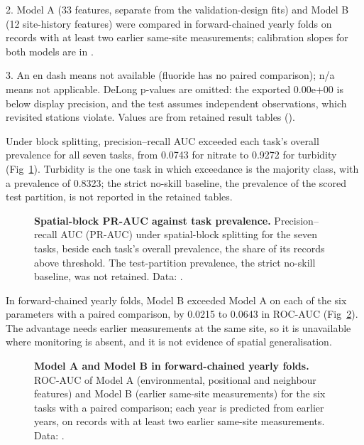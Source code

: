 \documentclass[10pt,letterpaper]{article}
\begin{document}
\begin{table}[!ht]
{\begin{flushleft}
2. Model A (33 features, separate from the validation-design fits) and Model B (12 site-history features) were compared in forward-chained yearly folds on records with at least two earlier same-site measurements; calibration slopes for both models are in .

3. An en dash means not available (fluoride has no paired comparison); n/a means not applicable. DeLong p-values are omitted: the exported 0.00e+00 is below display precision, and the test assumes independent observations, which revisited stations violate. Values are from retained result tables ().
\end{flushleft}
}
\label{table3}
\end{table}

Under block splitting, precision--recall AUC exceeded each task's overall prevalence for all seven tasks, from 0.0743 for nitrate to 0.9272 for turbidity (Fig~\ref{fig:prevalence-prauc}). Turbidity is the one task in which exceedance is the majority class, with a prevalence of 0.8323; the strict no-skill baseline, the prevalence of the scored test partition, is not reported in the retained tables.\label{callout:fig:prevalence-prauc}

\begin{figure}[!ht]
\caption{\textbf{Spatial-block PR-AUC against task prevalence.} Precision--recall AUC (PR-AUC) under spatial-block splitting for the seven tasks, beside each task's overall prevalence, the share of its records above threshold. The test-partition prevalence, the strict no-skill baseline, was not retained. Data: .}
\label{fig:prevalence-prauc}
\end{figure}

In forward-chained yearly folds, Model B exceeded Model A on each of the six parameters with a paired comparison, by 0.0215 to 0.0643 in ROC-AUC (Fig~\ref{fig:channel-comparison}). The advantage needs earlier measurements at the same site, so it is unavailable where monitoring is absent, and it is not evidence of spatial generalisation.\label{callout:fig:channel-comparison}

\begin{figure}[!ht]
\caption{\textbf{Model A and Model B in forward-chained yearly folds.} ROC-AUC of Model A (environmental, positional and neighbour features) and Model B (earlier same-site measurements) for the six tasks with a paired comparison; each year is predicted from earlier years, on records with at least two earlier same-site measurements. Data: .}
\label{fig:channel-comparison}
\end{figure}
\end{document}
